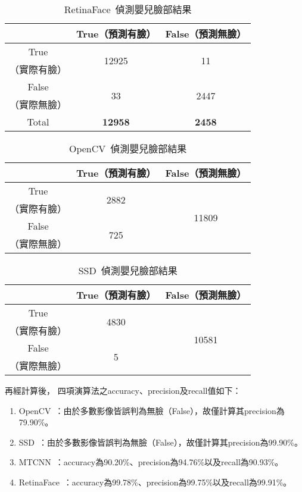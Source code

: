 \documentclass[class=NCU_thesis, crop=false]{standalone}
\begin{document}
\begin{table}[h]
    \centering
    \caption{RetinaFace~\cite{deng_retinaface_2020}偵測嬰兒臉部結果}
    \label{table:table-retinaface}
    \begin{tabular}{ccc}
    \hline
     & True（預測有臉）& False（預測無臉）\\
    \hline
    True & \multirow{2}{*}{12925} & \multirow{2}{*}{11} \\
    （實際有臉）& & \\
    False & \multirow{2}{*}{33} & \multirow{2}{*}{2447} \\
    （實際無臉）&  & \\
    \hline
    Total & \textbf{12958} & \textbf{2458} \\
    \hline
    \end{tabular}
\end{table}

\begin{table}[h]
    \centering
    \caption{OpenCV~\cite{goyal_face_2017}偵測嬰兒臉部結果}
    \label{table:table-opencv}
    \begin{tabular}{ccc}
    \hline
     & True（預測有臉）& False（預測無臉）\\
    \hline
    True & \multirow{2}{*}{2882} & \multirow{4}{*}{11809} \\
    （實際有臉）& & \\
    False & \multirow{2}{*}{725} & \\
    （實際無臉）&  & \\
    \hline
    \end{tabular}
\end{table}

\begin{table}[h]
    \centering
    \caption{SSD~\cite{ye_face_2021}偵測嬰兒臉部結果}
    \label{table:table-ssd}
    \begin{tabular}{ccc}
    \hline
     & True（預測有臉）& False（預測無臉）\\
    \hline
    True & \multirow{2}{*}{4830} & \multirow{4}{*}{10581} \\
    （實際有臉）& & \\
    False & \multirow{2}{*}{5} & \\
    （實際無臉）&  & \\
    \hline
    \end{tabular}
\end{table}

再經計算後，
四項演算法之accuracy、precision及recall值如下：
\begin{enumerate}
    \item OpenCV~\cite{goyal_face_2017}：由於多數影像皆誤判為無臉（False），故僅計算其precision為79.90\%。
    \item SSD~\cite{ye_face_2021}：由於多數影像皆誤判為無臉（False），故僅計算其precision為99.90\%。
    \item MTCNN~\cite{zhang_joint_2016}：accuracy為90.20\%、precision為94.76\%以及recall為90.93\%。
    \item RetinaFace~\cite{deng_retinaface_2020}：accuracy為99.78\%、precision為99.75\%以及recall為99.91\%。
\end{enumerate}
\end{document}
